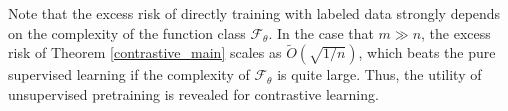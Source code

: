 Note that the excess risk of directly training with labeled data strongly depends on the complexity of the function class $\mathcal{F}_{\theta}$. In the case that $m\gg n$, the excess risk of Theorem \ref{contrastive_main} scales as $\tilde{O}(\sqrt{1/n})$, which beats the pure supervised learning if the complexity of $\mathcal{F}_{\theta}$ is quite large. Thus, the utility of unsupervised pretraining is revealed for contrastive learning.

